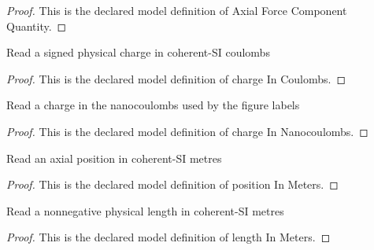 \begin{proof}
  This is the declared model definition of Axial Force Component Quantity.
\end{proof}
\begin{definition}
  \label{def:physics:phyx-mini-0892:phyxminiproblems-problemphyxmini0892-chargeincoulombs}
  Read a signed physical charge in coherent-SI coulombs
\end{definition}
\begin{proof}
  This is the declared model definition of charge In Coulombs.
\end{proof}
\begin{definition}
  \label{def:physics:phyx-mini-0892:phyxminiproblems-problemphyxmini0892-chargeinnanocoulombs}
  Read a charge in the nanocoulombs used by the figure labels
\end{definition}
\begin{proof}
  This is the declared model definition of charge In Nanocoulombs.
\end{proof}
\begin{definition}
  \label{def:physics:phyx-mini-0892:phyxminiproblems-problemphyxmini0892-positioninmeters}
  Read an axial position in coherent-SI metres
\end{definition}
\begin{proof}
  This is the declared model definition of position In Meters.
\end{proof}
\begin{definition}
  \label{def:physics:phyx-mini-0892:phyxminiproblems-problemphyxmini0892-lengthinmeters}
  Read a nonnegative physical length in coherent-SI metres
\end{definition}
\begin{proof}
  This is the declared model definition of length In Meters.
\end{proof}
